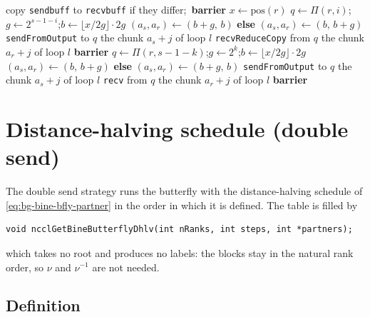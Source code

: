 \begin{algorithm}[t]
\caption{Bine allreduce, kernel of one channel.}
\label{alg:bfly-allreduce}
\begin{algorithmic}[1]
\State copy \texttt{sendbuff} to \texttt{recvbuff} if they differ;\ \textbf{barrier}
\State $x\gets\mathrm{pos}(r)$
  \State $q\gets\Pi(r,i)$;\quad $g\gets2^{s-1-i}$;\quad $b\gets\lfloor x/2g\rfloor\cdot2g$
   $(a_s,a_r)\gets(b+g,\,b)$ \textbf{else} $(a_s,a_r)\gets(b,\,b+g)$ \EndIf
    \State \texttt{sendFromOutput} to $q$ the chunk $a_s+j$ of loop $l$
    \State \texttt{recvReduceCopy} from $q$ the chunk $a_r+j$ of loop $l$
  \EndFor
  \State \textbf{barrier}
\EndFor
{}
  \State $q\gets\Pi(r,s-1-k)$;\quad $g\gets2^k$;\quad $b\gets\lfloor x/2g\rfloor\cdot2g$
   $(a_s,a_r)\gets(b,\,b+g)$ \textbf{else} $(a_s,a_r)\gets(b+g,\,b)$ \EndIf
    \State \texttt{sendFromOutput} to $q$ the chunk $a_s+j$ of loop $l$
    \State \texttt{recv} from $q$ the chunk $a_r+j$ of loop $l$
  \EndFor
  \State \textbf{barrier}
\EndFor
\end{algorithmic}
\end{algorithm}

\section{Distance-halving schedule (double send)}\label{sec:bfly-dhlv}

The double send strategy runs the butterfly with the distance-halving schedule of \cref{eq:bg-bine-bfly-partner} in the order in which it is defined.
The table is filled by
\begin{verbatim}
void ncclGetBineButterflyDhlv(int nRanks, int steps, int *partners);
\end{verbatim}
which takes no root and produces no labels: the blocks stay in the natural rank order, so $\nu$ and $\nu^{-1}$ are not needed.

\subsection{Definition}

